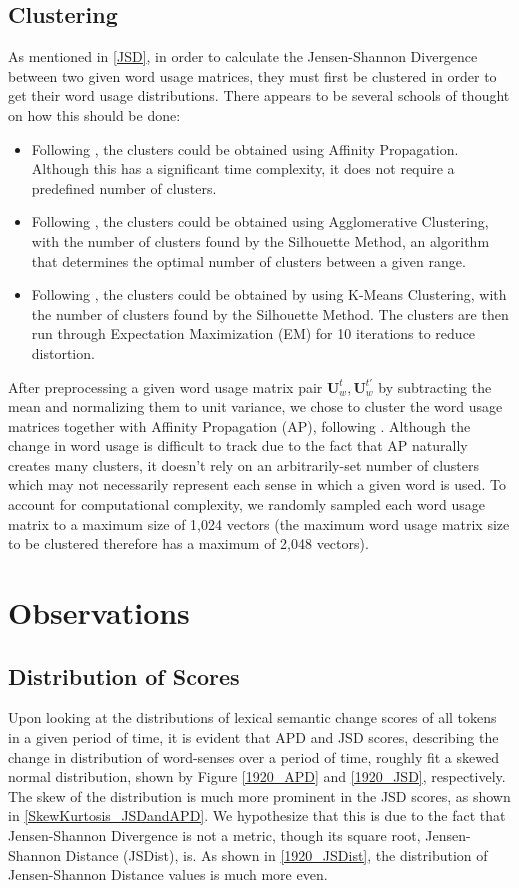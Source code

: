 \documentclass[10pt, a4paper]{article}
\begin{document}
\subsection{Clustering}
\label{clustering}
As mentioned in \ref{JSD}, in order to calculate the Jensen-Shannon Divergence between two given word usage matrices, they must first be clustered in order to get their word usage distributions. There appears to be several schools of thought on how this should be done:
\begin{itemize}
    \item{Following \cite{Martinc2020,Kutuzov2020}, the clusters could be obtained using Affinity Propagation. Although this has a significant time complexity, it does not require a predefined number of clusters.}
    \item{Following \cite{Laicher2021}, the clusters could be obtained using Agglomerative Clustering, with the number of clusters found by the Silhouette Method\cite{silhouette}, an algorithm that determines the optimal number of clusters between a given range.}
    \item{Following \cite{Giulianelli2020}, the clusters could be obtained by using K-Means Clustering, with the number of clusters found by the Silhouette Method. The clusters are then run through Expectation Maximization (EM) for 10 iterations to reduce distortion.}
\end{itemize}

After preprocessing a given word usage matrix pair $\textbf{U}^{t}_w, \textbf{U}^{t'}_w$ by subtracting the mean and normalizing them to unit variance, we chose to cluster the word usage matrices together with Affinity Propagation (AP), following \cite{Martinc2020,Kutuzov2020}. Although the change in word usage is difficult to track due to the fact that AP naturally creates many clusters, it doesn't rely on an arbitrarily-set number of clusters which may not necessarily represent each sense in which a given word is used. To account for computational complexity, we randomly sampled each word usage matrix to a maximum size of 1,024 vectors (the maximum word usage matrix size to be clustered therefore has a maximum of 2,048 vectors).

\section{Observations}
\subsection{Distribution of Scores}
Upon looking at the distributions of lexical semantic change scores of all tokens in a given period of time, it is evident that APD and JSD scores, describing the change in distribution of word-senses over a period of time, roughly fit a skewed normal distribution, shown by Figure \ref{1920_APD} and \ref{1920_JSD}, respectively. The skew of the distribution is much more prominent in the JSD scores, as shown in \ref{SkewKurtosis_JSDandAPD}. We hypothesize that this is due to the fact that Jensen-Shannon Divergence is not a metric, though its square root, Jensen-Shannon Distance (JSDist), is. As shown in \ref{1920_JSDist}, the distribution of Jensen-Shannon Distance values is much more even.
\end{document}
